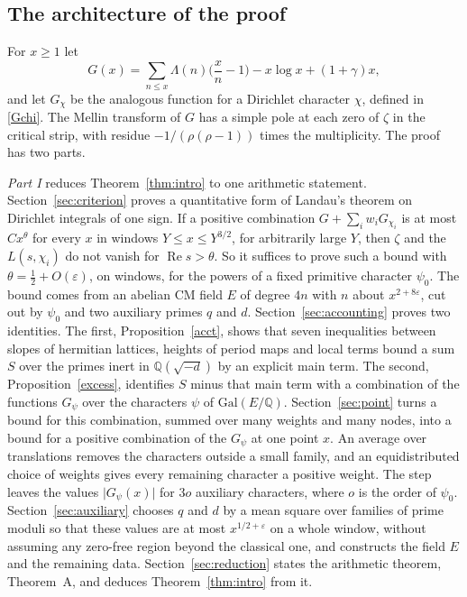 \subsection{The architecture of the proof}

For $x\ge1$ let
\[
G(x)=\sum_{n\le x}\Lambda(n)\Big(\frac xn-1\Big)-x\log x+(1+\gamma)x ,
\]
and let $G_\chi$ be the analogous function for a Dirichlet character $\chi$, defined in \eqref{Gchi}. The Mellin transform of $G$ has a simple pole at each zero of $\zeta$ in the critical strip, with residue $-1/(\rho(\rho-1))$ times the multiplicity. The proof has two parts.

\emph{Part I} reduces Theorem~\ref{thm:intro} to one arithmetic statement. Section~\ref{sec:criterion} proves a quantitative form of Landau's theorem on Dirichlet integrals of one sign. If a positive combination $G+\sum_iw_iG_{\chi_i}$ is at most $Cx^\theta$ for every $x$ in windows $Y\le x\le Y^{3/2}$, for arbitrarily large $Y$, then $\zeta$ and the $L(s,\chi_i)$ do not vanish for $\operatorname{Re}s>\theta$. So it suffices to prove such a bound with $\theta=\frac12+O(\varepsilon)$, on windows, for the powers of a fixed primitive character $\psi_0$. The bound comes from an abelian CM field $E$ of degree $4n$ with $n$ about $x^{2+8\varepsilon}$, cut out by $\psi_0$ and two auxiliary primes $q$ and $d$. Section~\ref{sec:accounting} proves two identities. The first, Proposition~\ref{acct}, shows that seven inequalities between slopes of hermitian lattices, heights of period maps and local terms bound a sum $S$ over the primes inert in $\mathbb Q(\sqrt{-d})$ by an explicit main term. The second, Proposition~\ref{excess}, identifies $S$ minus that main term with a combination of the functions $G_\psi$ over the characters $\psi$ of $\mathrm{Gal}(E/\mathbb Q)$. Section~\ref{sec:point} turns a bound for this combination, summed over many weights and many nodes, into a bound for a positive combination of the $G_\psi$ at one point $x$. An average over translations removes the characters outside a small family, and an equidistributed choice of weights gives every remaining character a positive weight. The step leaves the values $\lvert G_\psi(x)\rvert$ for $3o$ auxiliary characters, where $o$ is the order of $\psi_0$. Section~\ref{sec:auxiliary} chooses $q$ and $d$ by a mean square over families of prime moduli so that these values are at most $x^{1/2+\varepsilon}$ on a whole window, without assuming any zero-free region beyond the classical one, and constructs the field $E$ and the remaining data. Section~\ref{sec:reduction} states the arithmetic theorem, Theorem~A, and deduces Theorem~\ref{thm:intro} from it.

